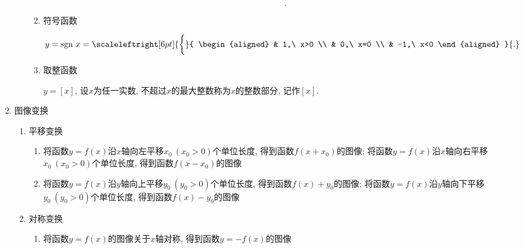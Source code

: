 \begin{enumerate}
\begin{enumerate}
\begin{enumerate}
\begin{equation*}
{\begin{aligned}
                                      \end{aligned}
                                  }{.}
                              \end{equation*}
                        \item 符号函数\par
                              \begin{equation*}
                                  y=\text{sgn}\ x=
                                  \scaleleftright[6pt]{\biggl\{}{
                                      \begin{aligned}
                                           & 1,\ x>0  \\
                                           & 0,\ x=0  \\
                                           & -1,\ x<0
                                      \end{aligned}
                                  }{.}
                              \end{equation*}
                        \item 取整函数\par
                              $ y=[x] $, 设$ x $为任一实数, 不超过$ x $的最大整数称为$ x $的整数部分, 记作$ [x] $.
                    \end{enumerate}
          \end{enumerate}
    \item 图像变换
          \begin{enumerate}
              \item 平移变换
                    \begin{enumerate}
                        \item 将函数$ y=f(x) $沿$ x $轴向左平移$ x_{0}\ (x_{0}>0) $个单位长度, 得到函数$ f(x+x_{0}) $的图像; 将函数$ y=f(x) $沿$ x $轴向右平移$ x_{0}\ (x_{0}>0) $个单位长度, 得到函数$ f(x-x_{0}) $的图像
                        \item 将函数$ y=f(x) $沿$ y $轴向上平移$ y_{0}\ (y_{0}>0) $个单位长度, 得到函数$ f(x)+y_{0} $的图像; 将函数$ y=f(x) $沿$ y $轴向下平移$ y_{0}\ (y_{0}>0) $个单位长度, 得到函数$ f(x)-y_{0} $的图像
                    \end{enumerate}
              \item 对称变换
                    \begin{enumerate}
                        \item 将函数$ y=f(x) $的图像关于$ x $轴对称, 得到函数$ y=-f(x) $的图像

\end{enumerate}
\end{enumerate}
\end{enumerate}
